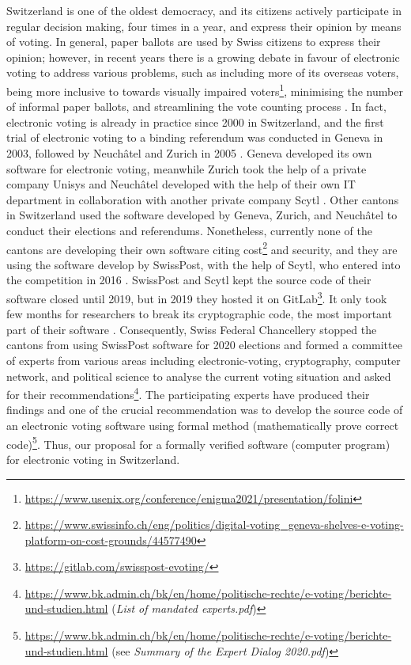 \documentclass[a4paper]{article}
\begin{document}
Switzerland is one of the oldest democracy, and its citizens 
actively participate in regular decision making, four times in a year,
and express their opinion by means of voting. 
In general, paper ballots are used by Swiss citizens to express their 
opinion; however, in recent years there is a growing debate 
in favour of electronic voting to address various problems, such as including more 
of its overseas voters, being more inclusive 
to towards visually impaired voters\footnote{\url{https://www.usenix.org/conference/enigma2021/presentation/folini}}, 
minimising the number of informal paper ballots, and streamlining the vote counting 
process \cite{7114482, DBLP:conf/ev/Driza-MaurerSTW12}.
In fact, electronic voting is already in practice since 2000 in 
Switzerland, and the first trial of electronic voting to 
a binding referendum was conducted in Geneva in 2003, followed 
by Neuch\^{a}tel and Zurich  in 2005  \cite{gerlach2009three}.
Geneva developed its own software for electronic voting, 
meanwhile Zurich took the help of a private company Unisys \cite{4454399}
and Neuch\^{a}tel developed with the help of their own IT department in collaboration
with another private company Scytl \cite{reiners2020vote}. 
Other cantons in Switzerland  
used the software developed by Geneva, Zurich, and Neuch\^{a}tel to conduct their elections and referendums.
Nonetheless, currently none of the cantons 
are developing their own software citing 
cost\footnote{\url{https://www.swissinfo.ch/eng/politics/digital-voting_geneva-shelves-e-voting-platform-on-cost-grounds/44577490}}
and security, and they are  
using the software develop by SwissPost, with the help of Scytl, 
who entered into the competition in 2016 \cite{10.1007/978-3-031-15911-4_4}.
SwissPost and Scytl kept the source code of their software closed until 2019, but in 2019 
they hosted it on GitLab\footnote{\url{https://gitlab.com/swisspost-evoting/}}.
It only took few months for 
researchers to break its cryptographic code, the most important part of 
their software \cite{9152765, locher2019analysis}.
Consequently, Swiss Federal Chancellery stopped the cantons from using 
SwissPost software for 2020 elections and formed a committee of 
experts from various areas including electronic-voting, cryptography, computer network, 
and political science to 
analyse the current voting situation and asked for their 
recommendations\footnote{\url{https://www.bk.admin.ch/bk/en/home/politische-rechte/e-voting/berichte-und-studien.html}
 (\textit{List of mandated experts.pdf})}. 
The participating experts have produced 
their findings and one of the crucial recommendation was to develop the source code 
of an electronic voting software using formal method (mathematically 
prove correct code)\footnote{\url{https://www.bk.admin.ch/bk/en/home/politische-rechte/e-voting/berichte-und-studien.html} (see 
\textit{Summary of the Expert Dialog 2020.pdf})}. Thus, our proposal for a formally verified 
software (computer program) for electronic voting in Switzerland. 
\end{document}
